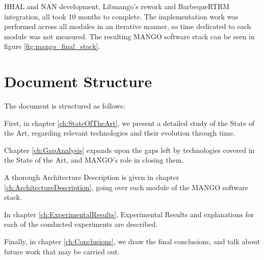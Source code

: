 HHAL and NAN development, Libmango's rework and BarbequeRTRM integration, all took 10 months to complete. The implementation work was performed across all modules in an iterative manner, so time dedicated to each module was not measured.
The resulting MANGO software stack can be seen in figure \ref{fig:mango_final_stack}.

\section{Document Structure}

The document is structured as follows:

First, in chapter \ref{ch:StateOfTheArt}, we present a detailed study of the State of the Art, regarding relevant technologies and their evolution through time.

Chapter \ref{ch:GapAnalysis} expands upon the gaps left by technologies covered in the State of the Art, and MANGO's role in closing them.

A thorough Architecture Description is given in chapter \ref{ch:ArchitectureDescription}, going over each module of the MANGO software stack.

In chapter \ref{ch:ExperimentalResults}, Experimental Results and explanations for each of the conducted experiments are described.

Finally, in chapter \ref{ch:Conclusions}, we draw the final conclusions, and talk about future work that may be carried out.


